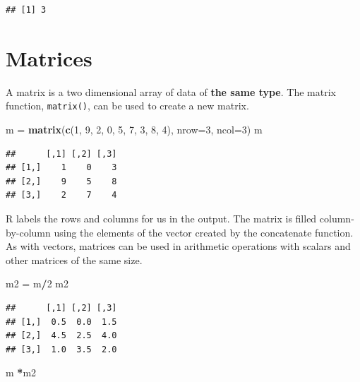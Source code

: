 \documentclass[
]{book}
\newenvironment{Shaded}{\begin{snugshade}}{\end{snugshade}}
\newcommand{\DataTypeTok}[1]{\textcolor[rgb]{0.13,0.29,0.53}{#1}}
\newcommand{\DecValTok}[1]{\textcolor[rgb]{0.00,0.00,0.81}{#1}}
\newcommand{\KeywordTok}[1]{\textcolor[rgb]{0.13,0.29,0.53}{\textbf{#1}}}
\newcommand{\NormalTok}[1]{#1}
\newcommand{\OperatorTok}[1]{\textcolor[rgb]{0.81,0.36,0.00}{\textbf{#1}}}
\newcommand{\StringTok}[1]{\textcolor[rgb]{0.31,0.60,0.02}{#1}}
\begin{document}
\begin{verbatim}
## [1] 3
\end{verbatim}

\hypertarget{matrices}{%
\section{Matrices}\label{matrices}}

A matrix is a two dimensional array of data of \textbf{the same type}. The matrix function, \texttt{matrix()}, can be used to create a new matrix.

\begin{Shaded}
\begin{Highlighting}[]
\NormalTok{m =}\StringTok{ }\KeywordTok{matrix}\NormalTok{(}\KeywordTok{c}\NormalTok{(}\DecValTok{1}\NormalTok{, }\DecValTok{9}\NormalTok{, }\DecValTok{2}\NormalTok{, }\DecValTok{0}\NormalTok{, }\DecValTok{5}\NormalTok{, }\DecValTok{7}\NormalTok{, }\DecValTok{3}\NormalTok{, }\DecValTok{8}\NormalTok{, }\DecValTok{4}\NormalTok{), }
           \DataTypeTok{nrow=}\DecValTok{3}\NormalTok{, }\DataTypeTok{ncol=}\DecValTok{3}\NormalTok{)}
\NormalTok{m}
\end{Highlighting}
\end{Shaded}

\begin{verbatim}
##      [,1] [,2] [,3]
## [1,]    1    0    3
## [2,]    9    5    8
## [3,]    2    7    4
\end{verbatim}

R labels the rows and columns for us in the output. The matrix is filled column-by-column using the elements of the vector created by the concatenate function. As with vectors, matrices can be used in arithmetic operations with scalars and other matrices of the same size.

\begin{Shaded}
\begin{Highlighting}[]
\NormalTok{m2 =}\StringTok{ }\NormalTok{m}\OperatorTok{/}\DecValTok{2}
\NormalTok{m2}
\end{Highlighting}
\end{Shaded}

\begin{verbatim}
##      [,1] [,2] [,3]
## [1,]  0.5  0.0  1.5
## [2,]  4.5  2.5  4.0
## [3,]  1.0  3.5  2.0
\end{verbatim}

\begin{Shaded}
\begin{Highlighting}[]
\NormalTok{m }\OperatorTok{*}\NormalTok{m2}
\end{Highlighting}
\end{Shaded}
\end{document}
